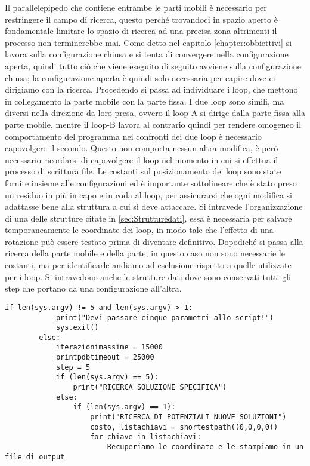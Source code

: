 Il parallelepipedo che contiene entrambe le parti mobili è necessario per restringere il campo di ricerca, questo perché trovandoci in spazio aperto è fondamentale limitare lo spazio di ricerca ad una precisa zona altrimenti il processo non terminerebbe mai. 
Come detto nel capitolo \ref{chapter:obbiettivi} si lavora sulla configurazione chiusa e si tenta di convergere nella configurazione aperta, quindi tutto ciò che viene eseguito di seguito avviene sulla configurazione chiusa; la configurazione aperta è quindi solo necessaria per capire dove ci dirigiamo con la ricerca. Procedendo si passa ad individuare i loop, che mettono in collegamento la parte mobile con la parte fissa. I due loop sono simili, ma diversi nella direzione da loro presa, ovvero il loop-A si dirige dalla parte fissa alla parte mobile, mentre il loop-B lavora al contrario quindi per rendere omogeneo il comportamento del programma nei confronti dei due loop è necessario capovolgere il secondo. Questo non comporta nessun altra modifica, è però necessario ricordarsi di capovolgere il loop nel momento in cui si effettua il processo di scrittura file. Le costanti sul posizionamento dei loop sono state fornite insieme alle configurazioni ed è importante sottolineare che è stato preso un residuo in più in capo e in coda al loop, per assicurarsi che ogni modifica si adattasse bene alla struttura a cui si deve attaccare. 
Si intravede l'organizzazione di una delle strutture citate in \ref{sec:Strutturedati}, essa è necessaria per salvare temporaneamente le coordinate dei loop, in modo tale che l'effetto di una rotazione può essere testato prima di diventare definitivo. Dopodiché si passa alla ricerca della parte mobile e della parte, in questo caso non sono necessarie le costanti, ma per identificarle andiamo ad esclusione rispetto a quelle utilizzate per i loop. Si intravedono anche le strutture dati dove sono conservati tutti gli step che portano da una configurazione all'altra. 

\begin{minipage}{\textwidth}
	\begin{lstlisting}[caption={Modalità di esecuzione}]
		if len(sys.argv) != 5 and len(sys.argv) > 1:
			print("Devi passare cinque parametri allo script!")
			sys.exit()
		else:
			iterazionimassime = 15000
			printpdbtimeout = 25000
			step = 5   
			if (len(sys.argv) == 5):
				print("RICERCA SOLUZIONE SPECIFICA") 
			else: 
				if (len(sys.argv) == 1):
					print("RICERCA DI POTENZIALI NUOVE SOLUZIONI")
					costo, listachiavi = shortestpath((0,0,0,0))
					for chiave in listachiavi:
						Recuperiamo le coordinate e le stampiamo in un file di output				
	\end{lstlisting}
\end{minipage}

